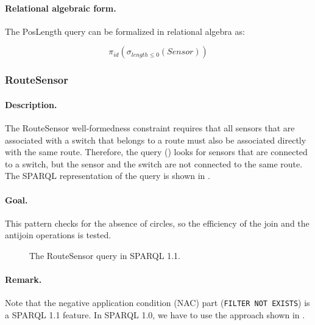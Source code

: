 \paragraph{Relational algebraic form.} The \textsf{PosLength} query can be formalized in relational algebra as:

$$ \pi_{\mathit{id}} \left( \sigma_{\mathit{length} \leq 0} \left( \mathit{Sensor} \right) \right) $$

\subsubsection{RouteSensor}

\paragraph{Description.} The \textsf{RouteSensor} well-formedness constraint requires that all sensors that are associated with a switch that belongs to a route must also be associated directly with the same route. Therefore, the query () looks for sensors that are connected to a switch, but the sensor and the switch are not connected to the same route. The SPARQL representation of the query is shown in .

\paragraph{Goal.} This pattern checks for the absence of circles, so the efficiency of the join and the antijoin operations is tested.

\begin{figure}[htb]
\centering
\begin{minipage}{0.6\textwidth}
  { \alignListing
    }
  \caption{The \textsf{RouteSensor} query in SPARQL 1.1.}
  \label{lst:routesensor-sparql-nac}
\end{minipage}
\end{figure}

\paragraph{Remark.} Note that the negative application condition (NAC) part (\texttt{FILTER NOT EXISTS}) is a SPARQL 1.1 feature. In SPARQL 1.0, we have to use the approach shown in .

